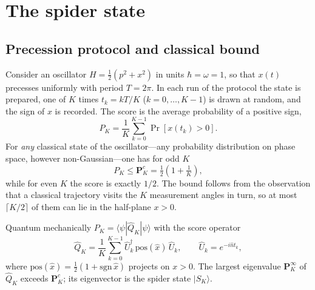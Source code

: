 \documentclass[aps,pra,reprint,superscriptaddress,amsmath,amssymb,nofootinbib]{revtex4-2}
\newcommand{\pos}{\mathrm{pos}}
\newcommand{\ket}[1]{|#1\rangle}
\newcommand{\bra}[1]{\langle#1|}
\newcommand{\n}{\hat n}
\newcommand{\Pc}{\mathbf{P}^{c}}
\newcommand{\Pq}{\mathbf{P}^{\infty}}
\begin{document}
\section{The spider state}\label{sec:spider}
\subsection{Precession protocol and classical bound}
Consider an oscillator $H=\tfrac12(p^2+x^2)$ in units $\hbar=\omega=1$, so that
$x(t)$ precesses uniformly with period $T=2\pi$. In each run of the protocol
the state is prepared, one of $K$ times $t_k=kT/K$ ($k=0,\dots,K-1$) is drawn
at random, and the sign of $x$ is recorded. The score is the average
probability of a positive sign,
\begin{equation}
  P_K=\frac1K\sum_{k=0}^{K-1}\Pr[x(t_k)>0]. \label{eq:score}
\end{equation}
For \emph{any} classical state of the oscillator---any probability
distribution on phase space, however non-Gaussian---one has for odd $K$
\cite{tsirelson2006,zaw2022}
\begin{equation}
  P_K\le\Pc_K=\tfrac12\left(1+\tfrac1K\right),
\end{equation}
while for even $K$ the score is exactly $1/2$. The bound follows from the
observation that a classical trajectory visits the $K$ measurement angles in
turn, so at most $\lceil K/2\rceil$ of them can lie in the half-plane $x>0$.

Quantum mechanically $P_K=\bra\psi\hat Q_K\ket\psi$ with the score operator
\begin{equation}
  \hat Q_K=\frac1K\sum_{k=0}^{K-1}\hat U_k^\dagger\,\pos(\hat x)\,\hat U_k,
  \qquad \hat U_k=e^{-i\n t_k}, \label{eq:QK}
\end{equation}
where $\pos(\hat x)=\tfrac12(1+\mathrm{sgn}\,\hat x)$ projects on $x>0$. The
largest eigenvalue $\Pq_K$ of $\hat Q_K$ exceeds $\Pc_K$; its eigenvector is
the spider state $\ket{S_K}$.
\end{document}
